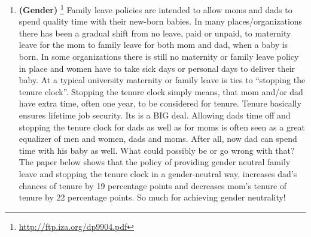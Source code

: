 \documentclass[
]{book}
\providecommand{\tightlist}{%
  \setlength{\itemsep}{0pt}\setlength{\parskip}{0pt}}
\begin{document}
\begin{enumerate}
\def\labelenumi{\arabic{enumi}.}
\setcounter{enumi}{5}
\tightlist
\item
  \textbf{(Gender)} \footnote{\url{http://ftp.iza.org/dp9904.pdf}} Family leave policies are intended to allow moms and dads to spend quality time with their new-born babies. In many places/organizations there has been a gradual shift from no leave, paid or unpaid, to maternity leave for the mom to family leave for both mom and dad, when a baby is born. In some organizations there is still no maternity or family leave policy in place and women have to take sick days or personal days to deliver their baby. At a typical university maternity or family leave is ties to ``stopping the tenure clock''. Stopping the tenure clock simply means, that mom and/or dad have extra time, often one year, to be considered for tenure. Tenure basically ensures lifetime job security. Its is a BIG deal.
  Allowing dads time off and stopping the tenure clock for dads as well as for moms is often seen as a great equalizer of men and women, dads and moms. After all, now dad can spend time with his baby as well. What could possibly be or go wrong with that?
  The paper below shows that the policy of providing gender neutral family leave and stopping the tenure clock in a gender-neutral way, increases dad's chances of tenure by 19 percentage points and decreases mom's tenure of tenure by 22 percentage points.
  So much for achieving gender neutrality!
\end{enumerate}
\end{document}
